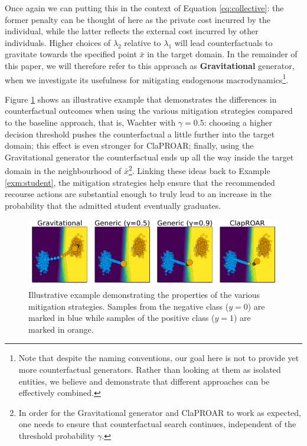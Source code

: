 \documentclass[conference,final,]{IEEEtran}
\theoremstyle{definition}
\theoremstyle{definition}
\theoremstyle{definition}
\theoremstyle{definition}
\theoremstyle{remark}
\begin{document}
Once again we can putting this in the context of Equation \eqref{eq:collective}: the former penalty can be thought of here as the private cost incurred by the individual, while the latter reflects the external cost incurred by other individuals. Higher choices of \(\lambda_2\) relative to \(\lambda_1\) will lead counterfactuals to gravitate towards the specified point \(\bar{x}\) in the target domain. In the remainder of this paper, we will therefore refer to this approach as \textbf{Gravitational} generator, when we investigate its usefulness for mitigating endogenous macrodynamics\footnote{Note that despite the naming conventions, our goal here is not to provide yet more counterfactual generators. Rather than looking at them as isolated entities, we believe and demonstrate that different approaches can be effectively combined.}.

Figure \ref{fig:mitigation} shows an illustrative example that demonstrates the differences in counterfactual outcomes when using the various mitigation strategies compared to the baseline approach, that is, Wachter with \(\gamma=0.5\): choosing a higher decision threshold pushes the counterfactual a little further into the target domain; this effect is even stronger for ClaPROAR; finally, using the Gravitational generator the counterfactual ends up all the way inside the target domain in the neighbourhood of \(\bar{x}\)\footnote{In order for the Gravitational generator and ClaPROAR to work as expected, one needs to ensure that counterfactual search continues, independent of the threshold probability \(\gamma\).}. Linking these ideas back to Example \ref{exm:student}, the mitigation strategies help ensure that the recommended recourse actions are substantial enough to truly lead to an increase in the probability that the admitted student eventually graduates.

\begin{figure}

{\centering \includegraphics[width=0.9\linewidth]{www/mitigation} 

}

\caption{Illustrative example demonstrating the properties of the various mitigation strategies. Samples from the negative class ($y=0$) are marked in blue while samples of the positive class ($y=1$) are marked in orange.}\label{fig:mitigation}
\end{figure}
\end{document}
